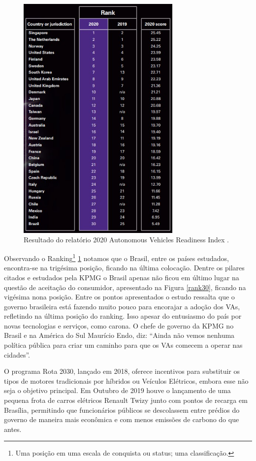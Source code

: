 \begin{figure}[H]
\centering
\includegraphics[width=8cm]{Figures/rank.jpg}
\caption{Resultado do relatório 2020 Autonomous Vehicles Readiness Index \cite{KPMG}.}
\label{KPMG}
\end{figure}

Observando o Ranking\footnote{Uma posição em uma escala de conquista ou status; uma classificação.} \ref{KPMG} notamos que o Brasil, entre os países estudados, encontra-se na trigésima posição, ficando na última colocação. Dentre os pilares citados e estudados pela KPMG o Brasil apenas não ficou em último lugar na questão de aceitação do consumidor, apresentado na Figura \ref{rank30}, ficando na vigésima nona posição.
Entre os pontos apresentados o estudo ressalta que o governo brasileira está fazendo muito pouco para encorajar a adoção dos VAs, refletindo na última posição do ranking. Isso apesar do entusiasmo do país por novas tecnologias e serviços, como carona. O chefe de governo da KPMG no Brasil e na América do Sul Maurício Endo, diz: “Ainda não vemos nenhuma política pública para criar um caminho para que os VAs comecem a operar nas cidades”.

O programa Rota 2030, lançado em 2018, oferece incentivos para substituir os tipos de motores tradicionais por híbridos ou Veículos Elétricos, embora esse não seja o objetivo principal. Em Outubro de 2019 houve o lançamento de uma pequena frota de carros elétricos Renault Twizy junto com pontos de recarga em Brasília, permitindo que funcionários públicos se descolassem entre prédios do governo de maneira mais econômica e com menos emissões de carbono do que antes.

